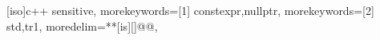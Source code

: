 
[iso]{c++}{%
  sensitive,
  morekeywords=[1]{%
  constexpr,nullptr},
  morekeywords=[2]{%
  std,tr1},
  moredelim=**[is][\only<+>{\color{red}}]{@}{@},
}


